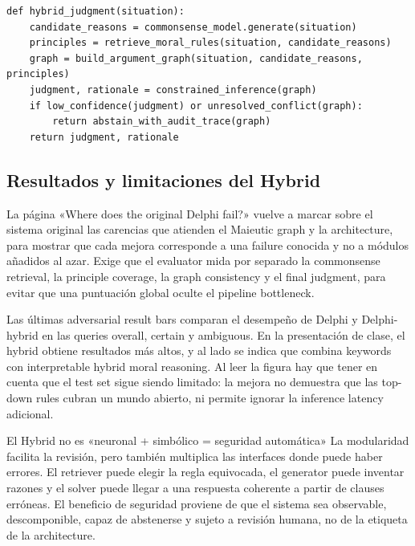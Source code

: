 \begin{lstlisting}[caption={Ciclo modular del Neuro-symbolic moral reasoning}]
def hybrid_judgment(situation):
    candidate_reasons = commonsense_model.generate(situation)
    principles = retrieve_moral_rules(situation, candidate_reasons)
    graph = build_argument_graph(situation, candidate_reasons, principles)
    judgment, rationale = constrained_inference(graph)
    if low_confidence(judgment) or unresolved_conflict(graph):
        return abstain_with_audit_trace(graph)
    return judgment, rationale
\end{lstlisting}

\subsection{Resultados y limitaciones del Hybrid}

La página «Where does the original Delphi fail?» vuelve a marcar sobre el sistema original las carencias que atienden el Maieutic graph y la architecture, para mostrar que cada mejora corresponde a una failure conocida y no a módulos añadidos al azar. Exige que el evaluator mida por separado la commonsense retrieval, la principle coverage, la graph consistency y el final judgment, para evitar que una puntuación global oculte el pipeline bottleneck.


Las últimas adversarial result bars comparan el desempeño de Delphi y Delphi-hybrid en las queries overall, certain y ambiguous. En la presentación de clase, el hybrid obtiene resultados más altos, y al lado se indica que combina keywords con interpretable hybrid moral reasoning. Al leer la figura hay que tener en cuenta que el test set sigue siendo limitado: la mejora no demuestra que las top-down rules cubran un mundo abierto, ni permite ignorar la inference latency adicional.


\begin{warningbox}{El Hybrid no es «neuronal + simbólico = seguridad automática»}
La modularidad facilita la revisión, pero también multiplica las interfaces donde puede haber errores. El retriever puede elegir la regla equivocada, el generator puede inventar razones y el solver puede llegar a una respuesta coherente a partir de clauses erróneas. El beneficio de seguridad proviene de que el sistema sea observable, descomponible, capaz de abstenerse y sujeto a revisión humana, no de la etiqueta de la architecture.
\end{warningbox}

